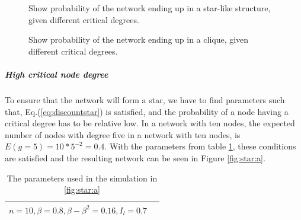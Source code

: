 \begin{figure}
\caption{\label{fig:PlotStarIsj} Show probability of the network ending up in a star-like structure, given different critical degrees.}
\end{figure}

\begin{figure}
\caption{\label{fig:PlotClique} Show probability of the network ending up in a clique, given different critical degrees.}
\end{figure}

\subparagraph{High critical node degree}
To ensure that the network will form a star, we have to find parameters such that, Eq.(\ref{eq:discountstar}) is satisfied, and the probability of a node having a critical degree has to be relative low. In a network with ten nodes, the expected number of nodes with degree five in a network with ten nodes, is $E(g=5)=10*5^{-2}=0.4$. With the parameters from table \ref{tbl:discountstar}, these conditions are satisfied and the resulting network can be seen in Figure \ref{fig:star:a}.
  
\begin{table}[h]
\centering
\begin{tabular}{lc}
 \hline
  $
  n=10,
  \beta=0.8,
  \beta-\beta^2=0.16,
  I_{l}=0.7$\\
  \hline
\end{tabular}
\caption{The parameters used in the simulation in \ref{fig:star:a} \label{tbl:discountstar}}
\end{table}

